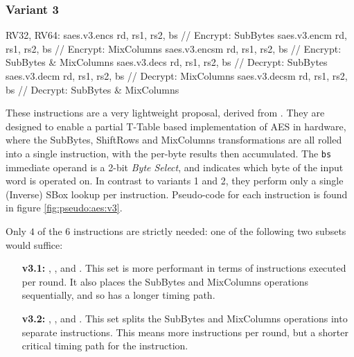 
\subsubsection{Variant 3}

\begin{cryptoisa}
RV32, RV64:
    saes.v3.encs      rd, rs1, rs2, bs // Encrypt: SubBytes
    saes.v3.encm      rd, rs1, rs2, bs // Encrypt: MixColumns
    saes.v3.encsm     rd, rs1, rs2, bs // Encrypt: SubBytes & MixColumns
    saes.v3.decs      rd, rs1, rs2, bs // Decrypt: SubBytes
    saes.v3.decm      rd, rs1, rs2, bs // Decrypt: MixColumns
    saes.v3.decsm     rd, rs1, rs2, bs // Decrypt: SubBytes & MixColumns
\end{cryptoisa}

These instructions are a very lightweight proposal, derived from
\cite{MJS:20}.
They are designed to enable a partial T-Table based implementation
of AES in hardware, where the SubBytes, ShiftRows and MixColumns
transformations are all rolled into a single instruction, with the
per-byte results then accumulated.
The {\tt bs} immediate operand is a 2-bit {\em Byte Select}, and indicates
which byte of the input word is operated on.
In contrast to variants 1 and 2, they perform only a single (Inverse) SBox
lookup per instruction.
Pseudo-code for each instruction is found in figure
\ref{fig:pseudo:aes:v3}.

Only $4$ of the $6$ instructions are strictly needed: one of the following two
subsets would suffice:
\begin{enumerate}
\item[{\bf v3.1:}]  ,
                    ,
                     and
                    .
    This set is more performant in terms of instructions executed per
    round.
    It also places the SubBytes and MixColumns operations
    sequentially, and so has a longer timing path.
\item[{\bf v3.2:}]  ,
                    ,
                     and
                    .
    This set splits the SubBytes and MixColumns operations into separate
    instructions.
    This means more instructions per round, but a shorter critical
    timing path for the instruction.
\end{enumerate}

